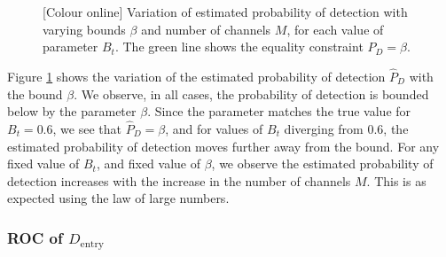 \documentclass[11pt]{article}
\begin{document}
\begin{figure}[h!]
\caption{[Colour online] Variation of estimated probability of detection with varying bounds $\beta$ and number of channels $M$, for each value of parameter $B_{t}$. The green line shows the equality constraint $P_{D}=\beta$.}
\label{fig:MCdentry}
\end{figure}

Figure \ref{fig:MCdentry} shows the variation of the estimated probability of detection $\hat{P}_{D}$ with the bound $\beta$. We observe, in all cases, the probability of detection is bounded below by the parameter $\beta$. Since the parameter matches the true value for $B_{t}=0.6$, we see that $\hat{P}_{D}=\beta$, and for values of $B_{t}$ diverging from $0.6$, the estimated probability of detection moves further away from the bound. For any fixed value of $B_{t}$, and fixed value of $\beta$, we observe the estimated probability of detection increases with the increase in the number of channels $M$. This is as expected using the law of large numbers.


\subsubsection{ROC of $D_{\text{entry}}$}
\label{subsubsec:entryDetector_roc}
\end{document}
